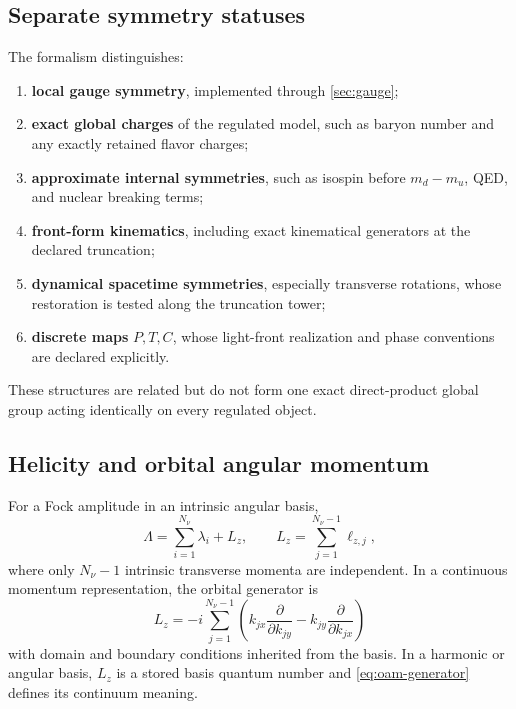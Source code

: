 \documentclass[11pt]{article}
\begin{document}
\subsection{Separate symmetry statuses}

The formalism distinguishes:
\begin{enumerate}
\item \textbf{local gauge symmetry}, implemented through
\cref{sec:gauge};
\item \textbf{exact global charges} of the regulated model, such as baryon
number and any exactly retained flavor charges;
\item \textbf{approximate internal symmetries}, such as isospin before
\(m_d-m_u\), QED, and nuclear breaking terms;
\item \textbf{front-form kinematics}, including exact kinematical generators
at the declared truncation;
\item \textbf{dynamical spacetime symmetries}, especially transverse
rotations, whose restoration is tested along the truncation tower;
\item \textbf{discrete maps} \(P,T,C\), whose light-front realization and
phase conventions are declared explicitly.
\end{enumerate}
These structures are related but do not form one exact direct-product global
group acting identically on every regulated object.

\subsection{Helicity and orbital angular momentum}

For a Fock amplitude in an intrinsic angular basis,
\begin{equation}
 \Lambda
 =\sum_{i=1}^{N_\nu}\lambda_i+L_z,
\qquad
 L_z=\sum_{j=1}^{N_\nu-1}\ell_{z,j},
\label{eq:jz-ledger}
\end{equation}
where only \(N_\nu-1\) intrinsic transverse momenta are independent.  In a
continuous momentum representation, the orbital generator is
\begin{equation}
 L_z
 =-i\sum_{j=1}^{N_\nu-1}
 \left(k_{jx}\frac{\partial}{\partial k_{jy}}
      -k_{jy}\frac{\partial}{\partial k_{jx}}\right)
\label{eq:oam-generator}
\end{equation}
with domain and boundary conditions inherited from the basis.  In a harmonic
or angular basis, \(L_z\) is a stored basis quantum number and
\cref{eq:oam-generator} defines its continuum meaning.
\end{document}
